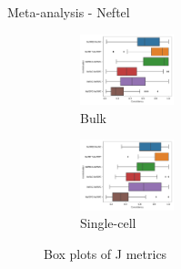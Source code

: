 \documentclass[aspectratio=169,9pt]{beamer}
\begin{document}
    \begin{frame}{Meta-analysis - Neftel}
        \begin{adjustwidth}{-5cm}{-5cm}
            \centering
            \begin{figure}\ContinuedFloat
                \centering
                \begin{subfigure}[c]{\textwidth}
                    \centering
                    \includegraphics[width=0.3\textwidth]{boxplot_Bulk_Nef_maxnorm}
                    \caption{Bulk}
                \end{subfigure}
                \begin{subfigure}[c]{\textwidth}
                    \centering
                    \includegraphics[width=0.3\textwidth]{boxplot_SC_Nef_maxnorm}
                    \caption{Single-cell}
                \end{subfigure}
                \caption{Box plots of J metrics}
            \end{figure}
        \end{adjustwidth}
    \end{frame}
\end{document}
